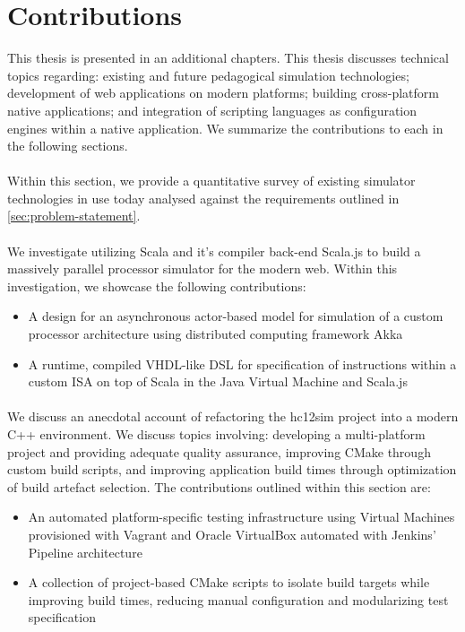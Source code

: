 \section{Contributions}

This thesis is presented in an additional  chapters. This thesis discusses technical topics regarding: existing and future pedagogical simulation technologies; development of web applications on modern platforms; building cross-platform native applications; and integration of scripting languages as configuration engines within a native application. We summarize the contributions to each in the following sections.

\paragraph{} Within this section, we provide a quantitative survey of existing simulator technologies in use today analysed against the requirements outlined in \cref{sec:problem-statement}.

\paragraph{} We investigate utilizing Scala and it's compiler back-end Scala.js to build a massively parallel processor simulator for the modern web. Within this investigation, we showcase the following contributions: 
\begin{itemize}
    \item A design for an asynchronous actor-based model for simulation of a custom processor architecture using distributed computing framework Akka
    \item A runtime, compiled VHDL-like DSL for specification of instructions within a custom ISA on top of Scala in the Java Virtual Machine and Scala.js
\end{itemize}

\paragraph{} We discuss an anecdotal account of refactoring the hc12sim project into a modern C++ environment. We discuss topics involving: developing a multi-platform project and providing adequate quality assurance, improving CMake through custom build scripts, and improving application build times through optimization of build artefact selection. The contributions outlined within this section are: 
\begin{itemize}
    \item An automated platform-specific testing infrastructure using Virtual Machines provisioned with Vagrant and Oracle VirtualBox automated with Jenkins' Pipeline architecture
    \item A collection of project-based CMake scripts to isolate build targets while improving build times, reducing manual configuration and modularizing test specification
\end{itemize}

